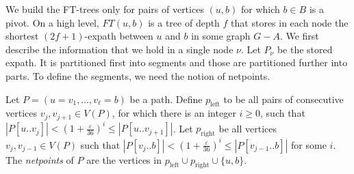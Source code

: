 \documentclass{article}\usepackage[a4paper,margin=20mm]{geometry}
\newcommand*{\length}[1]{|#1|}
\renewcommand{\le}{\leqslant}
\renewcommand{\ge}{\geqslant}
\newcommand{\eps}{\varepsilon}
\begin{document}
We build the FT-trees only for pairs of vertices $(u,b)$ for which $b \in B$ is a pivot.
On a high level, $FT(u,b)$ is a tree of depth $f$ 
that stores in each node the shortest $(2f{+}1)$-expath between $u$ and $b$ in some graph $G{-}A$.
We first describe the information that we hold in a single node $\nu$.
Let $P_\nu$ be the stored expath.
It is partitioned first into segments and those are partitioned further into parts.
To define the segments, we need the notion of netpoints.

\begin{definition}
\label{def:sparse_netpoints}
  Let $P = (u=v_1, \dots, v_\ell = b)$ be a path.
  Define $p_{\text{left}}$ to be all pairs of consecutive vertices $v_j,v_{j+1} \in V(P)$,
  for which there is an integer $i \ge 0$, 
  such that $\length{P[u..v_j]} < (1+ \tfrac{\eps}{36})^i \le \length{P[u..v_{j+1}]}$.
  Let $p_{\text{right}}$ be all vertices $v_j,v_{j-1} \in V(P)$ 
  such that $\length{P[v_j..b]} < (1+ \tfrac{\eps}{36})^i \le \length{P[v_{j-1}..b]}$
  for some $i$.
  The \emph{netpoints} of $P$ are the vertices in 
  $p_{\text{left}} \cup p_{\text{right}} \cup \{u,b\}$.
\end{definition}
\end{document}
